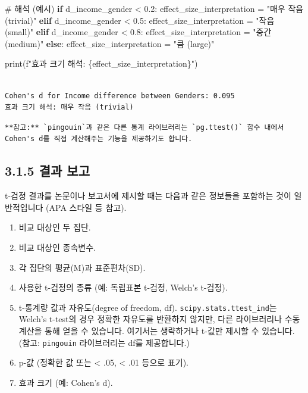 \documentclass[
  letterpaper,
]{book}
\newenvironment{Shaded}{\begin{snugshade}}{\end{snugshade}}
\newcommand{\BuiltInTok}[1]{\textcolor[rgb]{0.00,0.23,0.31}{#1}}
\newcommand{\CommentTok}[1]{\textcolor[rgb]{0.37,0.37,0.37}{#1}}
\newcommand{\ControlFlowTok}[1]{\textcolor[rgb]{0.00,0.23,0.31}{\textbf{#1}}}
\newcommand{\FloatTok}[1]{\textcolor[rgb]{0.68,0.00,0.00}{#1}}
\newcommand{\NormalTok}[1]{\textcolor[rgb]{0.00,0.23,0.31}{#1}}
\newcommand{\OperatorTok}[1]{\textcolor[rgb]{0.37,0.37,0.37}{#1}}
\newcommand{\SpecialCharTok}[1]{\textcolor[rgb]{0.37,0.37,0.37}{#1}}
\newcommand{\SpecialStringTok}[1]{\textcolor[rgb]{0.13,0.47,0.30}{#1}}
\newcommand{\StringTok}[1]{\textcolor[rgb]{0.13,0.47,0.30}{#1}}
\providecommand{\tightlist}{%
  \setlength{\itemsep}{0pt}\setlength{\parskip}{0pt}}
\begin{document}
\begin{Shaded}
\begin{Highlighting}[]
    \CommentTok{\# 해석 (예시)}
    \ControlFlowTok{if}\NormalTok{ d\_income\_gender }\OperatorTok{\textless{}} \FloatTok{0.2}\NormalTok{:}
\NormalTok{      effect\_size\_interpretation }\OperatorTok{=} \StringTok{"매우 작음 (trivial)"}
    \ControlFlowTok{elif}\NormalTok{ d\_income\_gender }\OperatorTok{\textless{}} \FloatTok{0.5}\NormalTok{:}
\NormalTok{      effect\_size\_interpretation }\OperatorTok{=} \StringTok{"작음 (small)"}
    \ControlFlowTok{elif}\NormalTok{ d\_income\_gender }\OperatorTok{\textless{}} \FloatTok{0.8}\NormalTok{:}
\NormalTok{      effect\_size\_interpretation }\OperatorTok{=} \StringTok{"중간 (medium)"}
    \ControlFlowTok{else}\NormalTok{:}
\NormalTok{      effect\_size\_interpretation }\OperatorTok{=} \StringTok{"큼 (large)"}

    \BuiltInTok{print}\NormalTok{(}\SpecialStringTok{f"효과 크기 해석: }\SpecialCharTok{\{}\NormalTok{effect\_size\_interpretation}\SpecialCharTok{\}}\SpecialStringTok{"}\NormalTok{)}
\end{Highlighting}
\end{Shaded}

\begin{verbatim}

Cohen's d for Income difference between Genders: 0.095
효과 크기 해석: 매우 작음 (trivial)
\end{verbatim}

\begin{verbatim}
**참고:** `pingouin`과 같은 다른 통계 라이브러리는 `pg.ttest()` 함수 내에서 Cohen's d를 직접 계산해주는 기능을 제공하기도 합니다.
\end{verbatim}

\subsection{3.1.5 결과 보고}\label{uxacb0uxacfc-uxbcf4uxace0}

t-검정 결과를 논문이나 보고서에 제시할 때는 다음과 같은 정보들을
포함하는 것이 일반적입니다 (APA 스타일 등 참고).

\begin{enumerate}
\def\labelenumi{\arabic{enumi}.}
\tightlist
\item
  비교 대상인 두 집단.
\item
  비교 대상인 종속변수.
\item
  각 집단의 평균(M)과 표준편차(SD).
\item
  사용한 t-검정의 종류 (예: 독립표본 t-검정, Welch's t-검정).
\item
  t-통계량 값과 자유도(degree of freedom, df).
  \texttt{scipy.stats.ttest\_ind}는 Welch's t-test의 경우 정확한
  자유도를 반환하지 않지만, 다른 라이브러리나 수동 계산을 통해 얻을 수
  있습니다. 여기서는 생략하거나 t-값만 제시할 수 있습니다. (참고:
  \texttt{pingouin} 라이브러리는 df를 제공합니다.)
\item
  p-값 (정확한 값 또는 \textless{} .05, \textless{} .01 등으로 표기).
\item
  효과 크기 (예: Cohen's d).
\end{enumerate}
\end{document}
